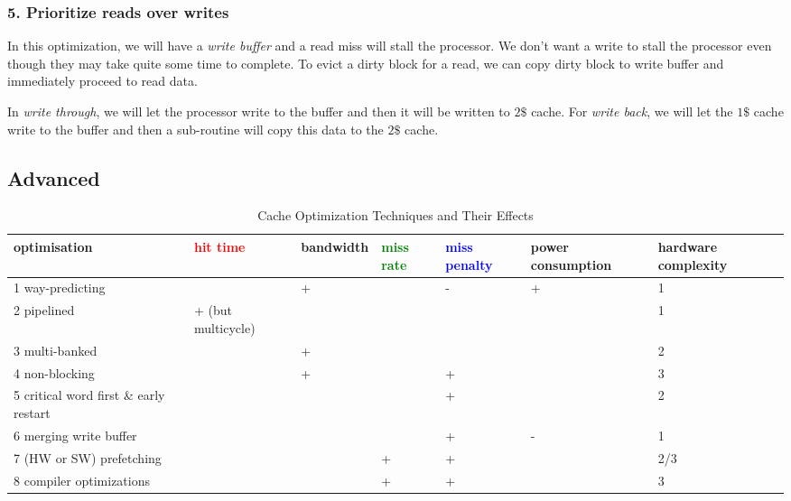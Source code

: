 \documentclass{report}
\begin{document}
\subsubsection{5. Prioritize reads over writes}

In this optimization, we will have a \textit{write buffer} and a read miss will stall the processor. We don't want a write to stall the processor even though they may take quite some time to complete. To evict a dirty block for a read, we can copy dirty block to write buffer and immediately proceed to read data. 

In \textit{write through}, we will let the processor write to the buffer and then it will be written to $2\$$ cache. For \textit{write back}, we will let the $1\$$ cache write to the buffer and then a sub-routine will copy this data to the $2\$$ cache.

\subsection{Advanced}

\begin{table}[H]
    \centering
    \begin{tabular}{|p{2.1cm}|p{1.8cm}|p{1.8cm}|p{1.8cm}|p{1.8cm}|p{1.8cm}|p{1.8cm}|}
        \hline
        \textbf{optimisation} & \textbf{\textcolor{red}{hit time}} & \textbf{bandwidth} & \textbf{\textcolor{green}{miss rate}} & \textbf{\textcolor{blue}{miss penalty}} & \textbf{power consumption} & \textbf{hardware complexity} \\
        \hline
        1 way-predicting &  & + &  & - & + & 1 \\
        2 pipelined & + (but multicycle) &  &  &  &  & 1 \\
        3 multi-banked &  & + &  &  &  & 2 \\
        4 non-blocking &  & + &  & + &  & 3 \\
        5 critical word first \& early restart &  &  &  & + &  & 2 \\
        6 merging write buffer &  &  &  & + & - & 1 \\
        7 (HW or SW) prefetching &  &  & + & + &  & 2/3 \\
        8 compiler optimizations &  &  & + & + &  & 3 \\
        \hline
    \end{tabular}
    \caption{Cache Optimization Techniques and Their Effects}
    \label{tab:cache_advanced_optimizations}
\end{table}
\end{document}
